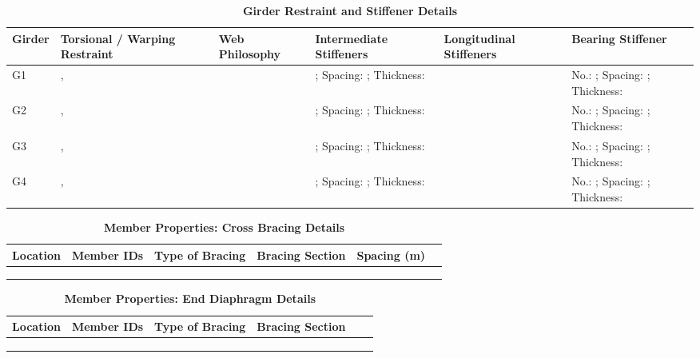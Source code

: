 \documentclass[12pt,a4paper]{report}
\numberwithin{table}{chapter}
\numberwithin{figure}{chapter}
\begin{document}
\vspace{4pt}
\begin{longtable}{|L{1.4cm}|p{2.2cm}|p{2.2cm}|p{3.0cm}|p{2.4cm}|p{2.2cm}|}
\caption{\textbf{Girder Restraint and Stiffener Details}}\\
\hline
\textbf{Girder} & \textbf{Torsional / Warping Restraint} & \textbf{Web Philosophy} & \textbf{Intermediate Stiffeners} & \textbf{Longitudinal Stiffeners} & \textbf{Bearing Stiffener} \\[6pt]
\hline
\endfirsthead
\endhead

G1 & ,  &  & ; Spacing: ; Thickness:  &  & No.: ; Spacing: ; Thickness:  \\[8pt]
\hline
G2 & ,  &  & ; Spacing: ; Thickness:  &  & No.: ; Spacing: ; Thickness:  \\[8pt]
\hline
G3 & ,  &  & ; Spacing: ; Thickness:  &  & No.: ; Spacing: ; Thickness:  \\[8pt]
\hline
G4 & ,  &  & ; Spacing: ; Thickness:  &  & No.: ; Spacing: ; Thickness:  \\[8pt]
\hline
\end{longtable}



\newpage

\vspace{0.4em}
\setlength{\tabcolsep}{4pt}
\setlength\LTleft{0pt}
\setlength\LTright{\fill}

\begin{longtable}{|L{2.2cm}|L{2.2cm}|L{3.0cm}|L{2.5cm}|C{1.8cm}|C{1.8cm}|}
\caption{\textbf{Member Properties: Cross Bracing Details}}
\hline
\textbf{Location} & \textbf{Member IDs} & \textbf{Type of Bracing} & \textbf{Bracing Section} & \textbf{Spacing (m)} \\
\hline
 &  &  &  &  \\[6pt]
\hline
 &  &  &  &  \\[6pt]
\hline
 &  &  &  &  \\[6pt]
\hline
\end{longtable}

\vspace{0.4em}
\noindent
\setlength{\tabcolsep}{4pt}
\setlength\LTleft{0pt}
\setlength\LTright{\fill}

\begin{longtable}{|L{2.2cm}|L{2.2cm}|L{3.0cm}|L{2.5cm}|C{1.8cm}|C{1.8cm}|}
\caption{\textbf{Member Properties: End Diaphragm Details}}
\hline
\textbf{Location} & \textbf{Member IDs} & \textbf{Type of Bracing} & \textbf{Bracing Section} \\
\hline
 &  &  &  \\[6pt]
\hline
 &  &  &  \\[6pt]
\hline
 &  &  &  \\[6pt]
\hline
\end{longtable}
\end{document}
